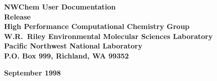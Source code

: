 
\begin{titlepage}

\begin{centering}


{\bf\Huge NWChem User Documentation}\\[0.5in] 
{\bf\Huge Release \nwchemversion}\\[1.0in]

{\bf\Large High Performance Computational Chemistry Group\\
    W.R.\ Riley Environmental Molecular Sciences Laboratory\\
    Pacific Northwest National Laboratory\\
    P.O. Box 999, Richland, WA 99352\\[0.5in]}

{\bf\Large September 1998}\\[1.0in]




\end{centering}

\end{titlepage}
